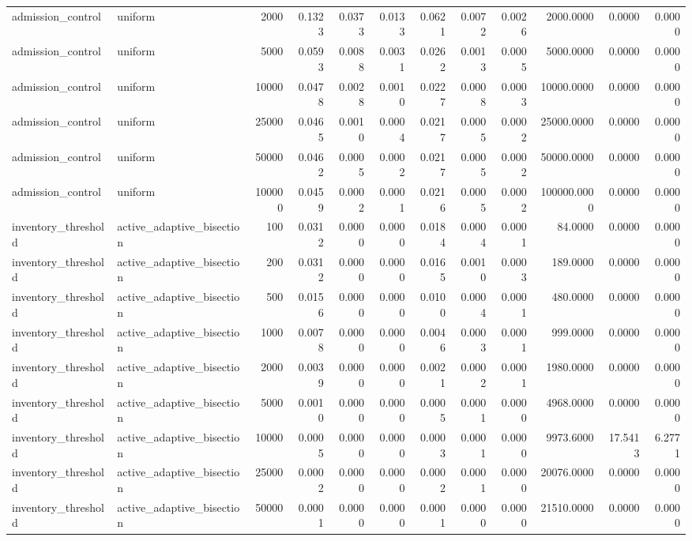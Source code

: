 \begin{tabular}{llrrrrrrrrrr}
admission_control & uniform & 2000 & 0.1323 & 0.0373 & 0.0133 & 0.0621 & 0.0072 & 0.0026 & 2000.0000 & 0.0000 & 0.0000 \\
admission_control & uniform & 5000 & 0.0593 & 0.0088 & 0.0031 & 0.0262 & 0.0013 & 0.0005 & 5000.0000 & 0.0000 & 0.0000 \\
admission_control & uniform & 10000 & 0.0478 & 0.0028 & 0.0010 & 0.0227 & 0.0008 & 0.0003 & 10000.0000 & 0.0000 & 0.0000 \\
admission_control & uniform & 25000 & 0.0465 & 0.0010 & 0.0004 & 0.0217 & 0.0005 & 0.0002 & 25000.0000 & 0.0000 & 0.0000 \\
admission_control & uniform & 50000 & 0.0462 & 0.0005 & 0.0002 & 0.0217 & 0.0005 & 0.0002 & 50000.0000 & 0.0000 & 0.0000 \\
admission_control & uniform & 100000 & 0.0459 & 0.0002 & 0.0001 & 0.0216 & 0.0005 & 0.0002 & 100000.0000 & 0.0000 & 0.0000 \\
inventory_threshold & active_adaptive_bisection & 100 & 0.0312 & 0.0000 & 0.0000 & 0.0184 & 0.0004 & 0.0001 & 84.0000 & 0.0000 & 0.0000 \\
inventory_threshold & active_adaptive_bisection & 200 & 0.0312 & 0.0000 & 0.0000 & 0.0165 & 0.0010 & 0.0003 & 189.0000 & 0.0000 & 0.0000 \\
inventory_threshold & active_adaptive_bisection & 500 & 0.0156 & 0.0000 & 0.0000 & 0.0100 & 0.0004 & 0.0001 & 480.0000 & 0.0000 & 0.0000 \\
inventory_threshold & active_adaptive_bisection & 1000 & 0.0078 & 0.0000 & 0.0000 & 0.0046 & 0.0003 & 0.0001 & 999.0000 & 0.0000 & 0.0000 \\
inventory_threshold & active_adaptive_bisection & 2000 & 0.0039 & 0.0000 & 0.0000 & 0.0021 & 0.0002 & 0.0001 & 1980.0000 & 0.0000 & 0.0000 \\
inventory_threshold & active_adaptive_bisection & 5000 & 0.0010 & 0.0000 & 0.0000 & 0.0005 & 0.0001 & 0.0000 & 4968.0000 & 0.0000 & 0.0000 \\
inventory_threshold & active_adaptive_bisection & 10000 & 0.0005 & 0.0000 & 0.0000 & 0.0003 & 0.0001 & 0.0000 & 9973.6000 & 17.5413 & 6.2771 \\
inventory_threshold & active_adaptive_bisection & 25000 & 0.0002 & 0.0000 & 0.0000 & 0.0002 & 0.0001 & 0.0000 & 20076.0000 & 0.0000 & 0.0000 \\
inventory_threshold & active_adaptive_bisection & 50000 & 0.0001 & 0.0000 & 0.0000 & 0.0001 & 0.0000 & 0.0000 & 21510.0000 & 0.0000 & 0.0000 \\

\end{tabular}
